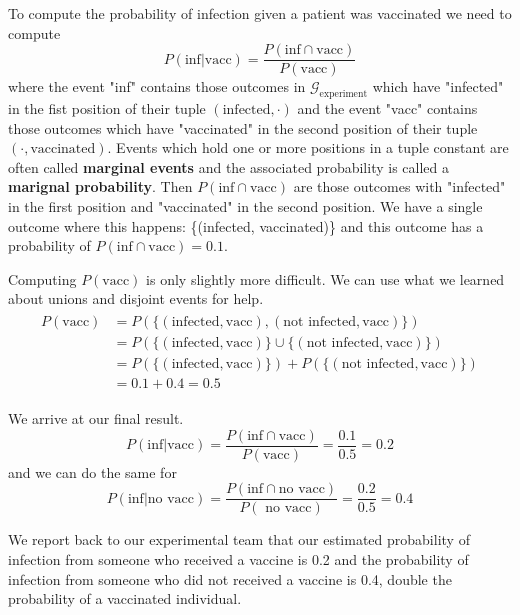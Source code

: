 To compute the probability of infection given a patient was vaccinated we need to compute
\begin{equation}
    P( \text{inf} | \text{vacc} ) = \frac{P(\text{inf} \cap \text{vacc})}{ P(\text{vacc})}
\end{equation}
where the event "inf" contains those outcomes in $\mathcal{G}_{\text{experiment}}$ which have "infected" in the fist position of their tuple $(\text{infected}, \cdot)$ and the event "vacc" contains those outcomes which have "vaccinated" in the second position of their tuple $(\cdot, \text{vaccinated} )$.
Events which hold one or more positions in a tuple constant are often called \textbf{marginal events} and the associated probability is called a \textbf{marignal probability}.
Then $P(\text{inf} \cap \text{vacc})$ are those outcomes with "infected" in the first position and "vaccinated" in the second position. We have a single outcome where this happens: \{(infected, vaccinated)\} and this outcome has a probability of $P(\text{inf} \cap \text{vacc}) = 0.1$.

Computing $P(\text{vacc})$ is only slightly more difficult. 
We can use what we learned about unions and disjoint events for help.
\begin{align}
    \begin{aligned}
       P(\text{vacc}) &= P( \{ (\text{infected},\text{vacc} ), (\text{not infected},\text{vacc} ) \}  ) \\ 
                     &=  P( \{ (\text{infected},\text{vacc} )\} \cup  \{(\text{not infected},\text{vacc} ) \}  ) \\
                     &=  P( \{ (\text{infected},\text{vacc} )\})+  P(\{(\text{not infected},\text{vacc} ) \}  )\\
                     &= 0.1+0.4 = 0.5
    \end{aligned}
\end{align}

We arrive at our final result.
\begin{equation}
 P( \text{inf} | \text{vacc} ) = \frac{P(\text{inf} \cap \text{vacc})}{ P(\text{vacc})} = \frac{0.1}{0.5} = 0.2
\end{equation}
and we can do the same for 
\begin{equation}
 P( \text{inf} | \text{no vacc} ) = \frac{P(\text{inf} \cap \text{no vacc})}{ P(\text{ no vacc})} = \frac{0.2}{0.5} = 0.4
\end{equation}

We report back to our experimental team that our estimated probability of infection from someone who received a vaccine is 0.2 and the probability of infection from someone who did not received a vaccine is 0.4, double the probability of a vaccinated individual.

